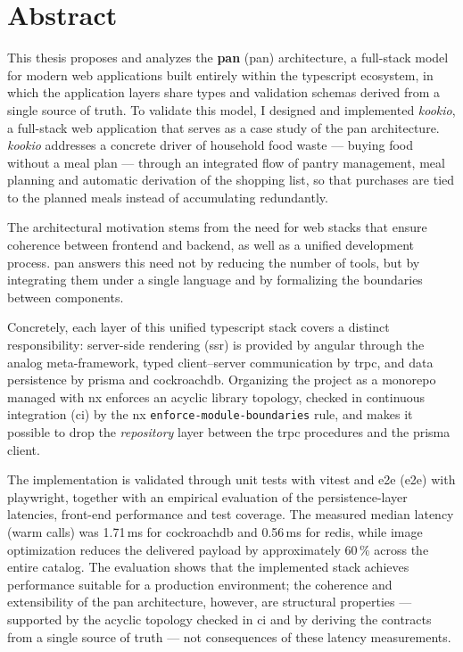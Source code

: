 \section*{Abstract}

This thesis proposes and analyzes the \textbf{\gls{pan}} (\acrlong{pan}) architecture, a full-stack model for modern \gls{web} applications built entirely within the \gls{typescript} ecosystem, in which the application layers share types and validation schemas derived from a single source of truth.
To validate this model, I designed and implemented \textit{\gls{kookio}}, a full-stack \gls{web} application that serves as a case study of the \gls{pan} architecture.
\textit{\gls{kookio}} addresses a concrete driver of household food waste --- buying food without a meal plan --- through an integrated flow of pantry management, meal planning and automatic derivation of the shopping list, so that purchases are tied to the planned meals instead of accumulating redundantly.

The architectural motivation stems from the need for \gls{web} stacks that ensure coherence between frontend and backend, as well as a unified development process.
\gls{pan} answers this need not by reducing the number of tools, but by integrating them under a single language and by formalizing the boundaries between components.

Concretely, each layer of this unified \gls{typescript} stack covers a distinct responsibility: server-side rendering (\acrshort{ssr}) is provided by \gls{angular} through the \gls{analog} meta-framework, typed client--server communication by \acrshort{trpc}, and data persistence by \gls{prisma} and \gls{cockroachdb}.
Organizing the project as a \gls{monorepo} managed with \gls{nx} enforces an acyclic library topology, checked in continuous integration (\acrshort{ci}) by the \gls{nx} \texttt{enforce-module-boundaries} rule, and makes it possible to drop the \textit{repository} layer between the \acrshort{trpc} procedures and the \gls{prisma} client.

The implementation is validated through unit tests with \gls{vitest} and \acrlong{e2e} (\acrshort{e2e}) with \gls{playwright}, together with an empirical evaluation of the persistence-layer latencies, front-end performance and test coverage.
The measured median latency (warm calls) was 1.71\,ms for \gls{cockroachdb} and 0.56\,ms for \gls{redis}, while image optimization reduces the delivered payload by approximately \(60\,\%\) across the entire catalog.
The evaluation shows that the implemented stack achieves performance suitable for a production environment; the coherence and extensibility of the \gls{pan} architecture, however, are structural properties --- supported by the acyclic topology checked in \acrshort{ci} and by deriving the contracts from a single source of truth --- not consequences of these latency measurements.
